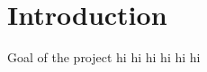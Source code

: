 \renewcommand*\chapterpagestyle{scrheadings}
\chapter{Introduction}
Goal of the project
\newpage
hi
\newpage
hi
\newpage
hi
\newpage
hi
\newpage
hi
\newpage
hi
